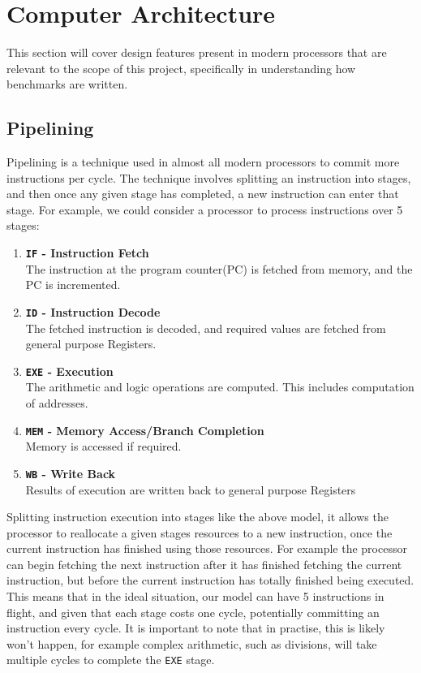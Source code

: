 \documentclass[bsc,frontabs,twoside,singlespacing,parskip,deptreport]{infthesis}     %
\begin{document}
\section{Computer Architecture}
This section will cover design features present in modern processors that are relevant to the scope of this project, specifically in understanding how benchmarks are written.

\subsection{Pipelining}
Pipelining is a technique used in almost all modern processors to commit more instructions per cycle. The technique involves splitting an instruction into stages, and then once any given stage has completed, a new instruction can enter that stage. For example, we could consider a processor to process instructions over 5 stages:
\begin{enumerate}
    \item{{\bf \texttt{IF} - Instruction Fetch} \\ The instruction at the program counter(PC) is fetched from memory, and the PC is incremented.}
    \item{{\bf \texttt{ID} - Instruction Decode} \\ The fetched instruction is decoded, and required values are fetched from general purpose Registers.}
    \item{{\bf \texttt{EXE} - Execution} \\ The arithmetic and logic operations are computed. This includes computation of addresses. }
    \item{{\bf \texttt{MEM} - Memory Access/Branch Completion} \\ Memory is accessed if required.}
    \item{{\bf \texttt{WB} - Write Back} \\ Results of execution are written back to general purpose Registers}
\end{enumerate}
Splitting instruction execution into stages like the above model, it allows the processor to reallocate a given stages resources to a new instruction, once the current instruction has finished using those resources. For example the processor can begin fetching the next instruction after it has finished fetching the current instruction, but before the current instruction has totally finished being executed. This means that in the ideal situation, our model can have 5 instructions in flight, and given that each stage costs one cycle, potentially committing an instruction every cycle. It is important to note that in practise, this is likely won't happen, for example complex arithmetic, such as divisions, will take multiple cycles to complete the \texttt{EXE} stage.
\end{document}
